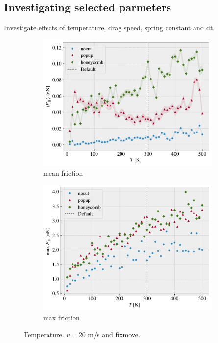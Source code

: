 \newpage
\subsection{Investigating selected parmeters}
Investigate effects of temperature, drag speed, spring constant and dt.


\begin{figure}[H]
  \centering
  \begin{subfigure}[b]{0.49\textwidth}
      \centering
      \includegraphics[width=\textwidth]{figures/baseline/variables_temp_mean_fixmove_v20.pdf}
      \caption{mean friction}
      \label{fig:var_temp_mean}
  \end{subfigure}
  \hfill
  \begin{subfigure}[b]{0.49\textwidth}
      \centering
      \includegraphics[width=\textwidth]{figures/baseline/variables_temp_max_fixmove_v20.pdf}
      \caption{max friction}
      \label{fig:var_temp_max}
  \end{subfigure}
  \hfill
     \caption{Temperature. $v = 20$ m/s and fixmove.}
     \label{fig:var_temp}
\end{figure}




